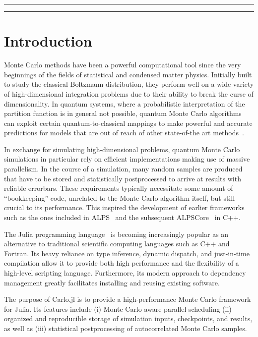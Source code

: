 \documentclass{SciPost}
\begin{document}
\vspace{10pt}
\noindent\rule{\textwidth}{1pt}
\tableofcontents
\noindent\rule{\textwidth}{1pt}
\vspace{10pt}

\section{Introduction}
\label{sec:intro}
Monte Carlo methods have been a powerful computational tool since the very beginnings of the fields of statistical and condensed matter physics\cite{Metropolis1953}. Initially built to study the classical Boltzmann distribution, they perform well on a wide variety of high-dimensional integration problems due to their ability to break the curse of dimensionality. In quantum systems, where a probabilistic interpretation of the partition function is in general not possible, quantum Monte Carlo algorithms can exploit certain quantum-to-classical mappings to make powerful and accurate predictions for models that are out of reach of other state-of-the art methods~\cite{Gubernatis2016}. 

In exchange for simulating high-dimensional problems, quantum Monte Carlo simulations in particular rely on efficient implementations making use of massive parallelism. In the course of a simulation, many random samples are produced that have to be stored and statistically postprocessed to arrive at results with reliable errorbars. These requirements typically necessitate some amount of ``bookkeeping'' code, unrelated to the Monte Carlo algorithm itself, but still crucial to its performance. This inspired the development of earlier frameworks such as the ones included in ALPS~\cite{ALPS} and the subsequent ALPSCore~\cite{ALPSCore} in C++.

The Julia programming language~\cite{Bezanson2012} is becoming increasingly popular as an alternative to traditional scientific computing languages such as C++ and Fortran. Its heavy reliance on type inference, dynamic dispatch, and just-in-time compilation allow it to provide both high performance and the flexibility of a high-level scripting language. Furthermore, its modern approach to dependency management greatly facilitates installing and reusing existing software.

The purpose of Carlo.jl is to provide a high-performance Monte Carlo framework for Julia. Its features include (i) Monte Carlo aware parallel scheduling (ii) organized and reproducible storage of simulation inputs, checkpoints, and results, as well as (iii) statistical postprocessing of autocorrelated Monte Carlo samples.
\end{document}
